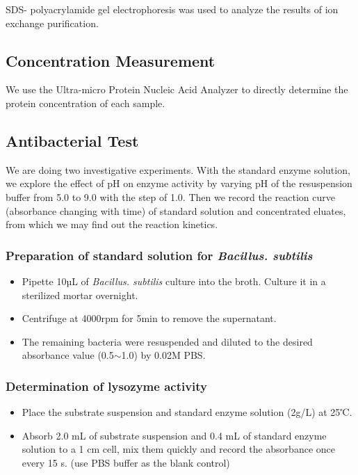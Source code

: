 SDS- polyacrylamide gel electrophoresis was used to analyze the results
of ion exchange purification. 


\subsection{Concentration Measurement}

We use the Ultra-micro Protein Nucleic Acid Analyzer to directly determine the protein concentration of each sample.

\subsection{Antibacterial Test \citep{activity,Liu2020}}

We are doing two investigative experiments. With the standard enzyme solution, we explore the effect of pH on enzyme activity by varying pH of the resuspension buffer from 5.0 to 9.0 with the step of 1.0. Then we record the reaction curve (absorbance changing with time) of standard solution and concentrated eluates, from which we may find out the reaction kinetics.

\subsubsection{Preparation of standard solution for \textit{Bacillus. subtilis}}

\begin{itemize}
	\item Pipette 10µL of \textit{Bacillus. subtilis} culture into the broth. Culture it in a sterilized mortar overnight.
	\item Centrifuge at 4000rpm for 5min to remove the supernatant.
	\item The remaining bacteria were resuspended and diluted to the desired absorbance value (0.5$\sim$1.0) by 0.02M PBS.
\end{itemize}

\subsubsection{Determination of lysozyme activity}

\begin{itemize}%
	\item Place the substrate suspension and standard enzyme solution (2g/L) at 25℃.
	\item Absorb 2.0 mL of substrate suspension and 0.4 mL of standard enzyme solution to a 1 cm cell, mix them quickly and record the absorbance once every 15 s. (use PBS buffer as the blank control)
\end{itemize}

